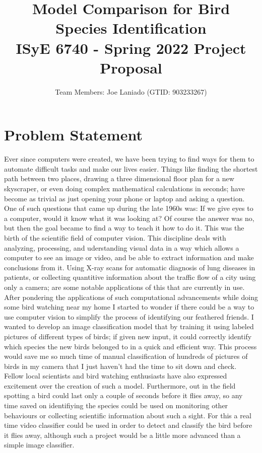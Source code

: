 \documentclass[11pt]{article}
\title{%
Model Comparison for Bird Species Identification\\
  \large ISyE 6740 - Spring 2022 Project Proposal}
\author{Team Members: Joe Laniado (GTID: 903233267)}
\begin{document}
\begin{singlespace}
\begin{titlepage}
\maketitle
\end{titlepage}
\tableofcontents
\clearpage

\section{Problem Statement}
Ever since computers were created, we have been trying to find ways for them to automate difficult tasks and make our lives easier. Things like finding the shortest path between two places, drawing a three dimensional floor plan for a new skyscraper, or even doing complex mathematical calculations in seconds; have become as trivial as just opening your phone or laptop and asking a question. One of such questions that came up during the late 1960s was: If we give eyes to a computer, would it know what it was looking at? 
Of course the answer was no, but then the goal became to find a way to teach it how to do it. This was the birth of the scientific field of computer vision. This discipline deals with analyzing, processing, and uderstanding visual data in a way which allows a computer to see an image or video, and be able to extract information and make conclusions from it. Using X-ray scans for automatic diagnosis of lung diseases in patients, or collecting quantitive information about the traffic flow of a city using only a camera; are some notable applications of this that are currently in use. \\

After pondering the applications of such computational advancements while doing some bird watching near my home I started to wonder if there could be a way to use computer vision to simplify the process of identifying our feathered friends. I wanted to develop an image classification model that by training it using labeled pictures of different types of birds; if given new input, it could correctly identify which species the new birds belonged to in a quick and efficient way. This process would save me so much time of manual classification of hundreds of pictures of birds in my camera that I just haven't had the time to sit down and check. Fellow local scientists and bird watching enthusiasts have also expressed excitement over the creation of such a model. Furthermore, out in the field spotting a bird could last only a couple of seconds before it flies away, so any time saved on identifiying the species could be used on monitoring other behaviours or collecting scientific information about such a sight. For this a real time video classifier could be used in order to detect and classify the bird before it flies away, although such a project would be a little more advanced than a simple image classifier. \\


\end{singlespace}
\end{document}
